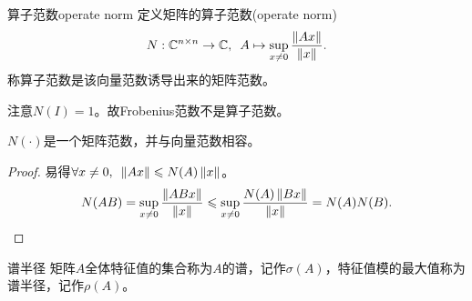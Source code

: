 \begin{definition}
    {算子范数}{operate norm}
    定义矩阵的算子范数(operate norm)
    \begin{equation}
        N:\mathbb C^{n\times n}\to\mathbb C,\enspace A\mapsto\sup_{x\neq 0}\frac{\left\lVert Ax\right\rVert}{\left\lVert x\right\rVert}.
    \end{equation}
    称算子范数是该向量范数诱导出来的矩阵范数。
\end{definition}

注意$N(I)=1$。故Frobenius范数不是算子范数。

\begin{theorem}
    {}{}
    $N(\cdot)$是一个矩阵范数，并与向量范数相容。 
\end{theorem}

\begin{proof}
    易得$\forall x\neq 0,\enspace\left\lVert Ax\right\rVert\leqslant N(A)\left\lVert x\right\rVert$。
    \[
        N(AB)=\sup_{x\neq 0}\frac{\left\lVert ABx\right\rVert}{\left\lVert x\right\rVert}\leqslant\sup_{x\neq 0}\frac{N(A)\left\lVert Bx\right\rVert}{\left\lVert x\right\rVert}=N(A)N(B).
        \qedhere
    \]
\end{proof}

\begin{definition}
    {谱半径}{}
    矩阵$A$全体特征值的集合称为$A$的谱，记作$\sigma(A)$，特征值模的最大值称为谱半径，记作$\rho(A)$。
\end{definition}

